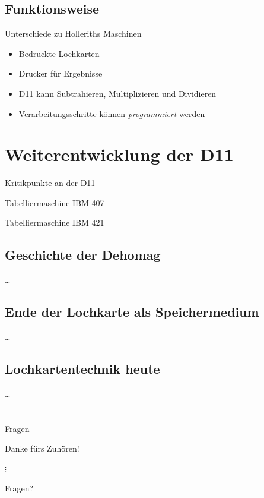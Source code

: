 \documentclass[EU2]{beamer}
\begin{document}
\subsection{Funktionsweise}

\begin{frame}{Unterschiede zu Holleriths Maschinen}
  \begin{itemize}
    \item Bedruckte Lochkarten
    \item Drucker für Ergebnisse
    \item D11 kann Subtrahieren, Multiplizieren und Dividieren
    \item Verarbeitungsschritte können \emph{programmiert} werden
  \end{itemize}
\end{frame}

\section{Weiterentwicklung der D11}

\begin{frame}{Kritikpunkte an der D11}
\end{frame}

\begin{frame}{Tabelliermaschine IBM 407}
\end{frame}

\begin{frame}{Tabelliermaschine IBM 421}
\end{frame}

\subsection{Geschichte der Dehomag}
\begin{frame}{…}
\end{frame}

\subsection{Ende der Lochkarte als Speichermedium}
\begin{frame}{…}
\end{frame}

\subsection{Lochkartentechnik heute}
\begin{frame}{…}
\end{frame}

\section*{}

\begin{frame}{Fragen}
  \begin{center}
    \Large{Danke fürs Zuhören!}
  \end{center}
  \begin{center}
    $\vdots$
  \end{center}
  \begin{center}
    \Large{Fragen?}
  \end{center}
\end{frame}
\end{document}
